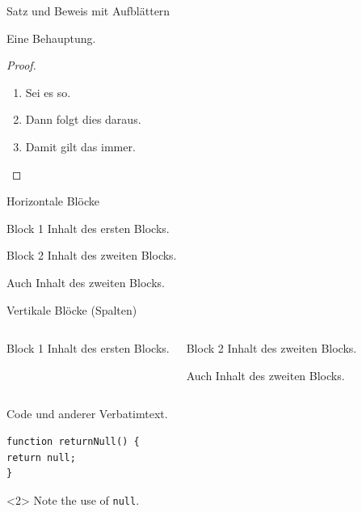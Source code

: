 	\begin{frame}{Satz und Beweis mit Aufblättern}
		\begin{theorem}
			Eine Behauptung.
		\end{theorem}
		\begin{proof}
			\begin{enumerate}
				\item<1-> Sei es so.
				\item<2-> Dann folgt dies daraus.
				\item<1-> Damit gilt das immer.\qedhere
			\end{enumerate}
		\end{proof}
	\end{frame}


	\begin{frame}{Horizontale Blöcke}
		\begin{block}{Block 1}
			Inhalt des ersten Blocks.
		\end{block}
		\begin{block}{Block 2}
			Inhalt des zweiten Blocks.

			Auch Inhalt des zweiten Blocks.
		\end{block}
	\end{frame}


	\begin{frame}{Vertikale Blöcke (Spalten)}
		\begin{columns}
				\begin{block}{Block 1}
					Inhalt des ersten Blocks.
				\end{block}
				\begin{block}{Block 2}
					Inhalt des zweiten Blocks.

					Auch Inhalt des zweiten Blocks.
				\end{block}
		\end{columns}
	\end{frame}


\begin{frame}[fragile]{Code und anderer Verbatimtext.}
\begin{verbatim}
function returnNull() {
return null;
}
\end{verbatim}
\begin{uncoverenv}<2>
Note the use of \verb|null|.
\end{uncoverenv}
\end{frame}


